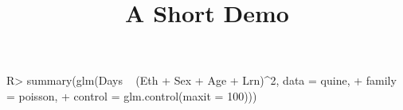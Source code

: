 \documentclass[article]{jss}
\title{A Short Demo}
\begin{document}
\begin{CodeInput}
R> summary(glm(Days ~ (Eth + Sex + Age + Lrn)^2, data = quine,
+     family = poisson,
+     control = glm.control(maxit = 100)))
\end{CodeInput}
\end{document}
